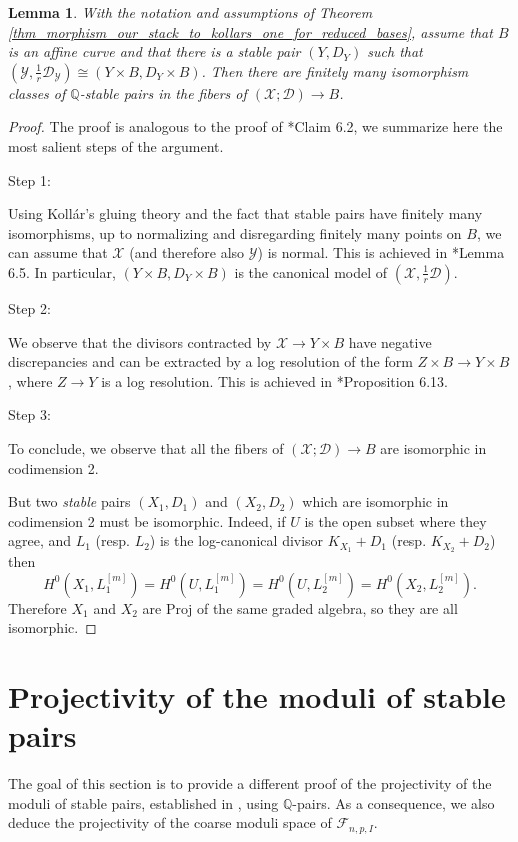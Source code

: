 \documentclass{amsart}
\newcommand{\bQ}{\mathbb{Q}}
\newcommand{\sF}{\mathscr{F}}
\newcommand{\cD}{\mathcal{D}}
\newcommand{\cX}{\mathcal{X}}
\newcommand{\cY}{\mathcal{Y}}
\newtheorem{Lemma}[theorem]{Lemma}
\theoremstyle{definition}
\begin{document}
\begin{Lemma}\label{lemma:finitedness:paper:zsolt}
With the notation and assumptions of Theorem \ref{thm_morphism_our_stack_to_kollars_one_for_reduced_bases}, assume that $B$ is an affine curve and that there is a stable pair $(Y,D_Y)$ such that $(\cY,\frac{1}{r}\cD_\cY)\cong (Y\times B,D_Y\times B)$.
Then there are finitely many isomorphism classes of $\bQ$-stable pairs in the fibers of $(\cX;\cD)\to B$.
\end{Lemma}
\begin{proof}
The proof is analogous to the proof of \cite{ABIP}*{Claim 6.2}, we summarize here the most salient steps of the argument.

\begin{bf}Step 1:\end{bf} Using Koll\'ar's gluing theory and the fact that stable pairs have finitely many isomorphisms, up to normalizing and disregarding finitely many points on $B$, we can assume that $\cX$ (and therefore also $\cY$) is normal.
This is achieved in \cite{ABIP}*{Lemma 6.5}.
In particular, $(Y\times B,D_Y\times B)$ is the canonical model of $(\cX,\frac{1}{r}\cD)$.

\begin{bf}Step 2:\end{bf} We observe that the divisors contracted by $\cX\to Y\times B$ have negative discrepancies and can be extracted by a log resolution of the form $Z\times B\to Y\times B$, where $Z\to Y$ is a log resolution.
This is achieved in \cite{ABIP}*{Proposition 6.13}.


\begin{bf}Step 3:\end{bf} To conclude, we observe that all the fibers of $(\cX;\cD)\to B$ are isomorphic in codimension 2.

But two \emph{stable} pairs $(X_1, D_1)$ and $(X_2, D_2)$ which are isomorphic in codimension 2 must be isomorphic. Indeed, if $U$ is the open subset where they agree, and $L_1$ (resp. $L_2$) is the log-canonical divisor $K_{X_1} + D_1$ (resp. $K_{X_2} + D_2$) then $$H^0(X_1, L_1^{[m]}) = H^0(U, L_1^{[m]}) = H^0(U, L_2^{[m]}) =  H^0(X_2, L_2^{[m]}).$$
Therefore $X_1$ and $X_2$ are $\mathrm{Proj}$ of the same graded algebra, so they are all isomorphic.
\end{proof}

\section{Projectivity of the moduli of stable pairs}
\label{section projectivity ksba}
The goal of this section is to provide a different proof of the projectivity of the moduli of stable pairs, established in \cite{KP17}, using $\bQ$-pairs.
As a consequence, we also deduce the projectivity of the coarse moduli space of $\sF_{n,p,I}$.
\end{document}
